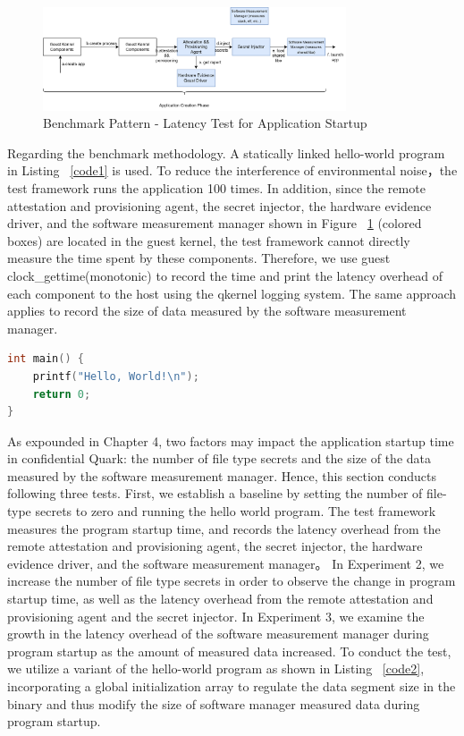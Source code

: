 \begin{figure}[H]
    \centering
    \includegraphics[width=0.8\textwidth]{images/micro_benchmark_app_life_cycle_bencmark_pattern.png}
    \caption[Benchmark Pattern - Latency Test for Application Startup]{Benchmark Pattern - Latency Test for Application Startup}
    \label{fig:micro_benchmark_app_life_cycle_bencmark_pattern}
\end{figure}


Regarding the benchmark methodology. A statically linked hello-world program in Listing ~\ref{code1} is used. To reduce the interference of environmental noise，the test framework runs the application 100 times. In addition, since the remote attestation and provisioning agent, the secret injector, 
the hardware evidence driver, and the software measurement manager shown in Figure  ~\ref{fig:micro_benchmark_app_life_cycle_bencmark_pattern}  (colored boxes) are located in the guest kernel, the test framework cannot directly measure the time spent by these components. Therefore, we use guest clock\_gettime(monotonic)\cite*{clock_gettime} to 
record the time and print the latency overhead of each component to the host using the qkernel logging system. The same approach applies to record the size of data measured by the software measurement manager. 

\begin{lstlisting}[language=C,frame=single,caption=Hello World Program,label=code1]
int main() {
    printf("Hello, World!\n");
    return 0;
}
\end{lstlisting}


As expounded in Chapter 4, two factors may impact the application startup time in confidential Quark: the number of file type secrets and the size of the data measured by the software measurement manager. Hence, this section conducts following three tests. First, we establish a baseline by setting the 
number of file-type secrets to zero and running the hello world program. The test framework measures the program startup time, and records the latency overhead from the remote attestation and provisioning agent, the secret injector, the hardware evidence driver, and the software measurement manager。  
In Experiment 2, we increase the number of file type secrets in order to observe the change in program startup time, as well as the latency overhead from the remote attestation and provisioning agent and the secret injector. In Experiment 3, we examine the growth in the latency overhead of the software 
measurement manager during program startup as the amount of measured data increased. To conduct the test, we utilize a variant of the hello-world program as shown in Listing ~\ref{code2}, incorporating a global initialization array to regulate the data segment size in the binary and thus modify the size 
of software manager measured data during program startup.


